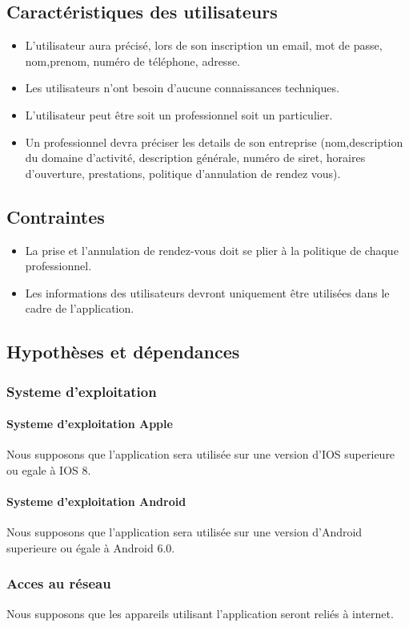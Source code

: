 \documentclass{article}
\begin{document}
\subsection{Caractéristiques des utilisateurs}
\begin{itemize}
\item L'utilisateur aura précisé, lors de son inscription un email, mot
de passe, nom,prenom, numéro de téléphone, adresse.
\item Les utilisateurs n'ont besoin d'aucune connaissances techniques.
\item L'utilisateur peut être soit un professionnel soit un particulier.
\item Un professionnel devra préciser les details de son entreprise (nom,description du
	domaine d'activité, description générale, numéro de siret, horaires d'ouverture, prestations, politique d'annulation de rendez vous).
\end{itemize}
\subsection{Contraintes}
\begin{itemize}
\item La prise et l'annulation de rendez-vous doit se plier à la
  politique de chaque professionnel.
\item Les informations des utilisateurs devront uniquement être
  utilisées dans le cadre de l'application.
\end{itemize}
\subsection{Hypothèses et dépendances}
\subsubsection{Systeme d'exploitation}
\paragraph{Systeme d'exploitation Apple}
Nous supposons que l'application sera utilisée sur une version d'IOS superieure ou egale à IOS 8.
\paragraph{Systeme d'exploitation Android}
Nous supposons que l'application sera utilisée sur une version d'Android superieure ou égale à Android 6.0.
\subsubsection{Acces au réseau}
Nous supposons que les appareils utilisant l'application seront reliés à internet.
\end{document}
